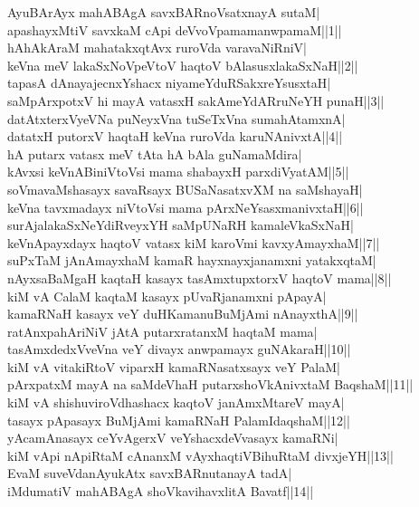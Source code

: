 \documentclass{article}
\begin{document}
AyuBArAyx mahABAgA savxBARnoVsatxnayA sutaM|\\
apashayxMtiV savxkaM cApi deVvoVpamamanwpamaM||1||\\
hAhAkAraM mahatakxqtAvx ruroVda varavaNiRniV|\\
keVna meV lakaSxNoVpeVtoV haqtoV bAlasusxlakaSxNaH||2||\\
tapasA dAnayajecnxYshacx niyameYduRSakxreYsusxtaH|\\
saMpArxpotxV hi mayA vatasxH sakAmeYdARruNeYH punaH||3||\\
datAtxterxVyeVNa puNeyxVna tuSeTxVna sumahAtamxnA|\\
datatxH putorxV haqtaH keVna ruroVda karuNAnivxtA||4||\\
hA putarx vatasx meV tAta hA bAla guNamaMdira|\\
kAvxsi keVnABiniVtoVsi mama shabayxH parxdiVyatAM||5||\\
soVmavaMshasayx savaRsayx BUSaNasatxvXM na saMshayaH|\\
keVna tavxmadayx niVtoVsi mama pArxNeYsasxmanivxtaH||6||\\
surAjalakaSxNeYdiRveyxYH saMpUNaRH kamaleVkaSxNaH|\\
keVnApayxdayx haqtoV vatasx kiM karoVmi kavxyAmayxhaM||7||\\
suPxTaM jAnAmayxhaM kamaR hayxnayxjanamxni yatakxqtaM|\\
nAyxsaBaMgaH kaqtaH kasayx tasAmxtupxtorxV haqtoV mama||8||\\
kiM vA CalaM kaqtaM kasayx pUvaRjanamxni pApayA|\\
kamaRNaH kasayx veY duHKamanuBuMjAmi nAnayxthA||9||\\
ratAnxpahAriNiV jAtA putarxratanxM haqtaM mama|\\
tasAmxdedxVveVna veY divayx anwpamayx guNAkaraH||10||\\
kiM vA vitakiRtoV viparxH kamaRNasatxsayx veY PalaM|\\
pArxpatxM mayA na saMdeVhaH putarxshoVkAnivxtaM BaqshaM||11||\\
kiM vA shishuviroVdhashacx kaqtoV janAmxMtareV mayA|\\
tasayx pApasayx BuMjAmi kamaRNaH PalamIdaqshaM||12||\\
yAcamAnasayx ceYvAgerxV veYshacxdeVvasayx kamaRNi|\\
kiM vApi nApiRtaM cAnanxM vAyxhaqtiVBihuRtaM divxjeYH||13||\\
EvaM suveVdanAyukAtx savxBARnutanayA tadA|\\
iMdumatiV mahABAgA shoVkavihavxlitA Bavatf||14||\\
\end{document}
